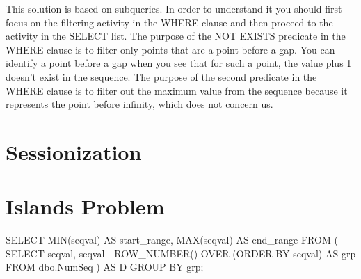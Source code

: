 \documentclass[
  letterpaper,
  DIV=11,
  numbers=noendperiod]{scrreprt}
\newenvironment{Shaded}{\begin{snugshade}}{\end{snugshade}}
\newcommand{\FunctionTok}[1]{\textcolor[rgb]{0.28,0.35,0.67}{#1}}
\newcommand{\KeywordTok}[1]{\textcolor[rgb]{0.00,0.23,0.31}{#1}}
\newcommand{\NormalTok}[1]{\textcolor[rgb]{0.00,0.23,0.31}{#1}}
\newcommand{\OperatorTok}[1]{\textcolor[rgb]{0.37,0.37,0.37}{#1}}
\begin{document}
This solution is based on subqueries. In order to understand it you
should first focus on the filtering activity in the WHERE clause and
then proceed to the activity in the SELECT list. The purpose of the NOT
EXISTS predicate in the WHERE clause is to filter only points that are a
point before a gap. You can identify a point before a gap when you see
that for such a point, the value plus 1 doesn't exist in the sequence.
The purpose of the second predicate in the WHERE clause is to filter out
the maximum value from the sequence because it represents the point
before infinity, which does not concern us.


\hypertarget{sessionization}{%
\chapter{Sessionization}\label{sessionization}}


\hypertarget{islands-problem}{%
\chapter{Islands Problem}\label{islands-problem}}

\begin{Shaded}
\begin{Highlighting}[]

\KeywordTok{SELECT} 
  \FunctionTok{MIN}\NormalTok{(seqval) }\KeywordTok{AS}\NormalTok{ start\_range, }
  \FunctionTok{MAX}\NormalTok{(seqval) }\KeywordTok{AS}\NormalTok{ end\_range }
\KeywordTok{FROM}\NormalTok{ (}
  \KeywordTok{SELECT} 
\NormalTok{    seqval, }
\NormalTok{    seqval }\OperatorTok{{-}} \FunctionTok{ROW\_NUMBER}\NormalTok{() }\KeywordTok{OVER}\NormalTok{ (}\KeywordTok{ORDER} \KeywordTok{BY}\NormalTok{ seqval) }\KeywordTok{AS}\NormalTok{ grp}
  \KeywordTok{FROM}\NormalTok{ dbo.NumSeq}
\NormalTok{  ) }\KeywordTok{AS}\NormalTok{ D }\KeywordTok{GROUP} \KeywordTok{BY}\NormalTok{ grp;}
\end{Highlighting}
\end{Shaded}


\hypertarget{section}{%
\chapter{}\label{section}}

\end{document}
